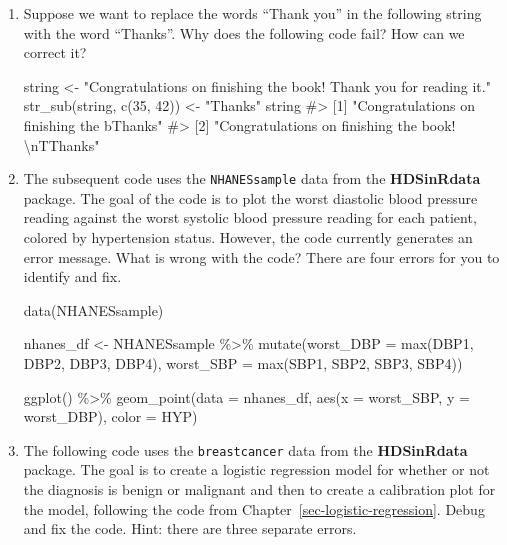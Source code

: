 \documentclass[
  letterpaper,
]{latex/krantz}
\makeatletter
\newenvironment{Shaded}{\begin{snugshade}}{\end{snugshade}}
\newcommand{\AttributeTok}[1]{\textcolor[rgb]{0.40,0.45,0.13}{#1}}
\newcommand{\CommentTok}[1]{\textcolor[rgb]{0.37,0.37,0.37}{#1}}
\newcommand{\DecValTok}[1]{\textcolor[rgb]{0.68,0.00,0.00}{#1}}
\newcommand{\FunctionTok}[1]{\textcolor[rgb]{0.28,0.35,0.67}{#1}}
\newcommand{\NormalTok}[1]{\textcolor[rgb]{0.00,0.23,0.31}{#1}}
\newcommand{\OtherTok}[1]{\textcolor[rgb]{0.00,0.23,0.31}{#1}}
\newcommand{\SpecialCharTok}[1]{\textcolor[rgb]{0.37,0.37,0.37}{#1}}
\newcommand{\StringTok}[1]{\textcolor[rgb]{0.13,0.47,0.30}{#1}}
\newenvironment{kframe}{%
\medskip{}
\setlength{\fboxsep}{.8em}
 \def\at@end@of@kframe{}%
 \ifinner\ifhmode%
  \def\at@end@of@kframe{\end{minipage}}%
  \begin{minipage}{\columnwidth}%
 \fi\fi%
 \def\FrameCommand##1{\hskip\@totalleftmargin \hskip-\fboxsep
 \colorbox{shadecolor}{##1}\hskip-\fboxsep
     \hskip-\linewidth \hskip-\@totalleftmargin \hskip\columnwidth}%
 \MakeFramed {\advance\hsize-\width
   \@totalleftmargin\z@ \linewidth\hsize
   \@setminipage}}%
 {\par\unskip\endMakeFramed%
 \at@end@of@kframe}
\renewenvironment{Shaded}{\begin{kframe}}{\end{kframe}}
\makeatother
\begin{document}
\begin{enumerate}
\def\labelenumi{\arabic{enumi}.}
\item
  Suppose we want to replace the words ``Thank you'' in the following
  string with the word ``Thanks''. Why does the following code fail? How
  can we correct it?

\begin{Shaded}
\begin{Highlighting}[]
\NormalTok{string }\OtherTok{\textless{}{-}} \StringTok{"Congratulations on finishing the book! }
\StringTok{Thank you for reading it."}
\FunctionTok{str\_sub}\NormalTok{(string, }\FunctionTok{c}\NormalTok{(}\DecValTok{35}\NormalTok{, }\DecValTok{42}\NormalTok{)) }\OtherTok{\textless{}{-}} \StringTok{"Thanks"}
\NormalTok{string}
\CommentTok{\#\textgreater{} [1] "Congratulations on finishing the bThanks"        }
\CommentTok{\#\textgreater{} [2] "Congratulations on finishing the book! \textbackslash{}nTThanks"}
\end{Highlighting}
\end{Shaded}
\item
  The subsequent code uses the \texttt{NHANESsample} data from the
  \textbf{HDSinRdata} package. The goal of the code is to plot the worst
  diastolic blood pressure reading against the worst systolic blood
  pressure reading for each patient, colored by hypertension status.
  However, the code currently generates an error message. What is wrong
  with the code? There are four errors for you to identify and fix.

\begin{Shaded}
\begin{Highlighting}[]
\FunctionTok{data}\NormalTok{(NHANESsample)}

\NormalTok{nhanes\_df }\OtherTok{\textless{}{-}}\NormalTok{ NHANESsample }\SpecialCharTok{\%\textgreater{}\%} 
  \FunctionTok{mutate}\NormalTok{(}\AttributeTok{worst\_DBP =} \FunctionTok{max}\NormalTok{(DBP1, DBP2, DBP3, DBP4), }
     \AttributeTok{worst\_SBP =} \FunctionTok{max}\NormalTok{(SBP1, SBP2, SBP3, SBP4))}

\FunctionTok{ggplot}\NormalTok{() }\SpecialCharTok{\%\textgreater{}\%} 
  \FunctionTok{geom\_point}\NormalTok{(}\AttributeTok{data =}\NormalTok{ nhanes\_df, }
             \FunctionTok{aes}\NormalTok{(}\AttributeTok{x =}\NormalTok{ worst\_SBP, }\AttributeTok{y =}\NormalTok{ worst\_DBP), }
             \AttributeTok{color =}\NormalTok{ HYP)}
\end{Highlighting}
\end{Shaded}
\item
  The following code uses the \texttt{breastcancer} data from the
  \textbf{HDSinRdata} package. The goal is to create a logistic
  regression model for whether or not the diagnosis is benign or
  malignant and then to create a calibration plot for the model,
  following the code from Chapter~\ref{sec-logistic-regression}. Debug
  and fix the code. Hint: there are three separate errors.


\end{enumerate}
\end{document}
